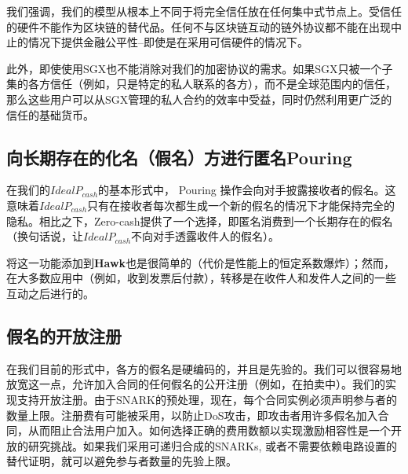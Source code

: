 \documentclass{xduugtrans}
\begin{document}
我们强调，我们的模型从根本上不同于将完全信任放在任何集中式节点上。受信任的硬件不能作为区块链的替代品。任何不与区块链互动的链外协议都不能在出现中止的情况下提供金融公平性--即使是在采用可信硬件的情况下。

此外，即使使用SGX也不能消除对我们的加密协议的需求。如果SGX只被一个子集的各方信任（例如，只是特定的私人联系的各方），而不是全球范围内的信任，那么这些用户可以从SGX管理的私人合约的效率中受益，同时仍然利用更广泛的信任的基础货币。

\subsection{向长期存在的化名（假名）方进行匿名Pouring}

在我们的$IdealP_{cash}$的基本形式中， Pouring 操作会向对手披露接收者的假名。这意味着$IdealP_{cash}$只有在接收者每次都生成一个新的假名的情况下才能保持完全的隐私。相比之下，Zero-cash\cite{ref11}提供了一个选择，即匿名消费到一个长期存在的假名（换句话说，让$IdealP_{cash}$不向对手透露收件人的假名）。

将这一功能添加到\textbf{Hawk}也是很简单的（代价是性能上的恒定系数爆炸）；然而，在大多数应用中（例如，收到发票后付款），转移是在收件人和发件人之间的一些互动之后进行的。

\subsection{假名的开放注册}

在我们目前的形式中，各方的假名是硬编码的，并且是先验的。我们可以很容易地放宽这一点，允许加入合同的任何假名的公开注册（例如，在拍卖中）。我们的实现支持开放注册。由于SNARK的预处理，现在，每个合同实例必须声明参与者的数量上限。注册费有可能被采用，以防止DoS攻击，即攻击者用许多假名加入合同，从而阻止合法用户加入。如何选择正确的费用数额以实现激励相容性是一个开放的研究挑战。如果我们采用可递归合成的SNARKs\cite{ref18}, \cite{ref25}或者不需要依赖电路设置的替代证明\cite{ref16}，就可以避免参与者数量的先验上限。
\end{document}
